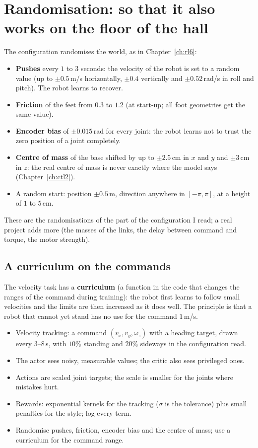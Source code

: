 \section*{Randomisation: so that it also works on the floor of the hall}
The configuration randomises the world, as in Chapter~\ref{ch:rl6}:
\begin{itemize}[nosep]
 \item \textbf{Pushes} every $1$ to $3$ seconds: the velocity of the robot is set to a random value (up to $\pm0.5$\,m/s horizontally, $\pm0.4$ vertically and $\pm0.52$\,rad/s in roll and pitch). The robot learns to recover.
 \item \textbf{Friction} of the feet from $0.3$ to $1.2$ (at start-up; all foot geometries get the same value).
 \item \textbf{Encoder bias} of $\pm0.015$\,rad for every joint: the robot learns not to trust the zero position of a joint completely.
 \item \textbf{Centre of mass} of the base shifted by up to $\pm2.5$\,cm in $x$ and $y$ and $\pm3$\,cm in $z$: the real centre of mass is never exactly where the model says (Chapter~\ref{ch:ctl2}).
 \item A random start: position $\pm0.5$\,m, direction anywhere in $[-\pi,\pi]$, at a height of $1$ to $5$\,cm.
\end{itemize}
These are the randomisations of the part of the configuration I read; a real project adds more (the masses of the links, the delay between command and torque, the motor strength).

\subsection*{A curriculum on the commands}
The velocity task has a \textbf{curriculum} (a function in the code that changes the ranges of the command during training): the robot first learns to follow small velocities and the limits are then increased as it does well. The principle is that a robot that cannot yet stand has no use for the command $1$\,m/s.

\begin{keyidea}[Summary]
\begin{itemize}[nosep]
 \item Velocity tracking: a command $(v_x,v_y,\omega_z)$ with a heading target, drawn every $3$--$8$\,s, with $10\%$ standing and $20\%$ sideways in the configuration read.
 \item The actor sees noisy, measurable values; the critic also sees privileged ones.
 \item Actions are scaled joint targets; the scale is smaller for the joints where mistakes hurt.
 \item Rewards: exponential kernels for the tracking ($\sigma$ is the tolerance) plus small penalties for the style; log every term.
 \item Randomise pushes, friction, encoder bias and the centre of mass; use a curriculum for the command range.
\end{itemize}
\end{keyidea}

